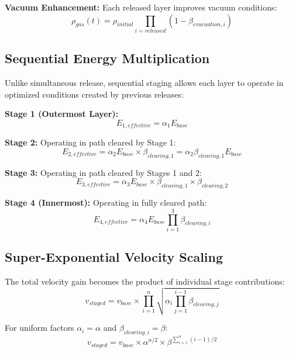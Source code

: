 \documentclass[12pt,a4paper]{article}
\begin{document}
\textbf{Vacuum Enhancement:}
Each released layer improves vacuum conditions:
\begin{equation}
\rho_{gas}(t) = \rho_{initial} \prod_{i=released} (1 - \beta_{evacuation,i})
\end{equation}

\subsection{Sequential Energy Multiplication}

Unlike simultaneous release, sequential staging allows each layer to operate in optimized conditions created by previous releases:

\textbf{Stage 1 (Outermost Layer):}
\begin{equation}
E_{1,effective} = \alpha_1 E_{base}
\end{equation}

\textbf{Stage 2:}
Operating in path cleared by Stage 1:
\begin{equation}
E_{2,effective} = \alpha_2 E_{base} \times \beta_{clearing,1} = \alpha_2 \beta_{clearing,1} E_{base}
\end{equation}

\textbf{Stage 3:}
Operating in path cleared by Stages 1 and 2:
\begin{equation}
E_{3,effective} = \alpha_3 E_{base} \times \beta_{clearing,1} \times \beta_{clearing,2}
\end{equation}

\textbf{Stage 4 (Innermost):}
Operating in fully cleared path:
\begin{equation}
E_{4,effective} = \alpha_4 E_{base} \prod_{i=1}^{3} \beta_{clearing,i}
\end{equation}

\subsection{Super-Exponential Velocity Scaling}

The total velocity gain becomes the product of individual stage contributions:
\begin{equation}
v_{staged} = v_{base} \times \prod_{i=1}^{n} \sqrt{\alpha_i \prod_{j=1}^{i-1} \beta_{clearing,j}}
\end{equation}

For uniform factors $\alpha_i = \alpha$ and $\beta_{clearing,i} = \beta$:
\begin{equation}
v_{staged} = v_{base} \times \alpha^{n/2} \times \beta^{\sum_{i=1}^{n}(i-1)/2}
\end{equation}
\end{document}
